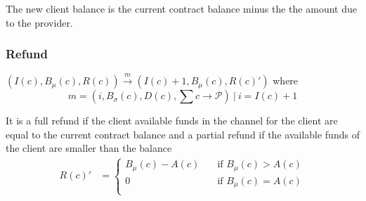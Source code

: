 \documentclass{llncs}
\begin{document}
The new client balance is the current contract balance minus the the amount due to the provider.

\subsubsection{Refund} $(I(c), B_\mu(c),R(c)) \xrightarrow{m} (I(c)+1, B_\mu(c), R(c)')$ where
$$m = (i, B_\sigma(c), D(c), \textstyle\sum c \rightarrow \mathcal{P})\ |\ i = I(c)+1$$

It is a full refund if the client available funds in the channel for the client are equal to the current contract balance and a partial refund if the available funds of the client are smaller than the balance
\begin{equation*}
\begin{split}
    R(c)' &=
  \begin{cases}
      B_\mu(c) - A(c) & \quad \text{if } B_\mu(c) > A(c) \\
      0 & \quad \text{if } B_\mu(c) = A(c) \\
  \end{cases}
\end{split}
\end{equation*}

%
%
%
\end{document}
